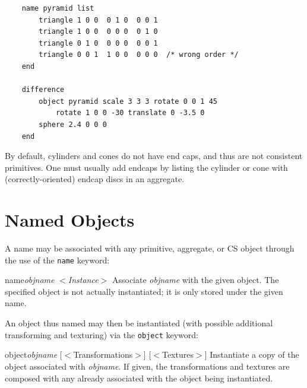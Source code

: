\begin{verbatim}
    name pyramid list
        triangle 1 0 0  0 1 0  0 0 1
        triangle 1 0 0  0 0 0  0 1 0
        triangle 0 1 0  0 0 0  0 0 1
        triangle 0 0 1  1 0 0  0 0 0  /* wrong order */
    end

    difference
        object pyramid scale 3 3 3 rotate 0 0 1 45
            rotate 1 0 0 -30 translate 0 -3.5 0
        sphere 2.4 0 0 0
    end
\end{verbatim}

By default, cylinders and cones do not have end caps, and thus
are not consistent primitives.  One must usually
add endcaps by listing the
cylinder or cone with (correctly-oriented) endcap discs in an aggregate.

\section {Named Objects}

A name may be associated with any primitive, aggregate, or CS
object through the use of the {\tt name}
keyword:

\begin{defkey}{name}{{\em objname} $<${\em Instance\/}$>$}
	Associate {\em objname} with the given object.  The
	specified object is not actually instantiated; it
	is only stored under the given name.
\end{defkey}

An object thus named may then be instantiated (with possible
additional transforming and texturing) via the {\tt object} keyword:

\begin{defkey}{object}{{\em objname} [$<$Transformations$>$] [$<$Textures$>$]}
	Instantiate a copy of the object associated with {\em objname}.
	If given, the transformations and textures are composed
	with any already associated with
	the object being instantiated.
\end{defkey}
